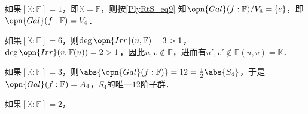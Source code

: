 如果$[\mathbb{K}:\mathbb{F}]=1$，即$\mathbb{K}=\mathbb{F}$，则按\autoref{PlyRtS_eq9} 知$\opn{Gal}(f:\mathbb{F})/V_4=\{e\}$，即$\opn{Gal}(f:\mathbb{F})=V_4$．

如果$[\mathbb{K}:\mathbb{F}]=6$，则$\deg\opn{Irr}(u, \mathbb{F})=3>1$，$\deg\opn{Irr}(v, \mathbb{F}(u))=2>1$，因此$u, v\not\in\mathbb{F}$，进而有$u', v'\not\in\mathbb{F}(u, v)=\mathbb{K}$．

如果$[\mathbb{K}:\mathbb{F}]=3$，则$\abs{\opn{Gal}(f:\mathbb{F})}=12=\frac{1}{2}\abs{S_4}$，于是$\opn{Gal}(f:\mathbb{F})=A_4$，$S_4$的唯一$12$阶子群．

如果$[\mathbb{K}:\mathbb{F}]=2$，







